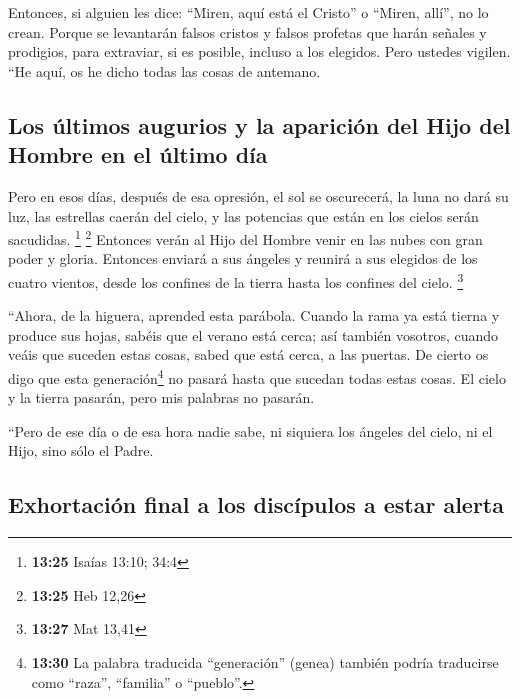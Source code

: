 \begin{paracol}{2}
 Entonces, si alguien les dice: ``Miren, aquí está el
Cristo'' o ``Miren, allí'', no lo crean.  Porque se
levantarán falsos cristos y falsos profetas que harán señales y
prodigios, para extraviar, si es posible, incluso a los elegidos.
 Pero ustedes vigilen. ``He aquí, os he dicho todas las
cosas de antemano.

\hypertarget{los-uxfaltimos-augurios-y-la-apariciuxf3n-del-hijo-del-hombre-en-el-uxfaltimo-duxeda}{%
\subsection{Los últimos augurios y la aparición del Hijo del Hombre en
el último
día}\label{los-uxfaltimos-augurios-y-la-apariciuxf3n-del-hijo-del-hombre-en-el-uxfaltimo-duxeda}}

 Pero en esos días, después de esa opresión, el sol se
oscurecerá, la luna no dará su luz,  las estrellas caerán
del cielo, y las potencias que están en los cielos serán sacudidas.
\footnote{\textbf{13:25} Isaías 13:10; 34:4} \footnote{\textbf{13:25}
  Heb 12,26}  Entonces verán al Hijo del Hombre venir en
las nubes con gran poder y gloria.  Entonces enviará a
sus ángeles y reunirá a sus elegidos de los cuatro vientos, desde los
confines de la tierra hasta los confines del cielo. \footnote{\textbf{13:27}
  Mat 13,41}

 ``Ahora, de la higuera, aprended esta parábola. Cuando
la rama ya está tierna y produce sus hojas, sabéis que el verano está
cerca;  así también vosotros, cuando veáis que suceden
estas cosas, sabed que está cerca, a las puertas.  De
cierto os digo que esta generación\footnote{\textbf{13:30} La palabra
  traducida ``generación'' (genea) también podría traducirse como
  ``raza'', ``familia'' o ``pueblo''.} no pasará hasta que sucedan todas
estas cosas.  El cielo y la tierra pasarán, pero mis
palabras no pasarán.

 ``Pero de ese día o de esa hora nadie sabe, ni siquiera
los ángeles del cielo, ni el Hijo, sino sólo el Padre.

\hypertarget{exhortaciuxf3n-final-a-los-discuxedpulos-a-estar-alerta}{%
\subsection{Exhortación final a los discípulos a estar
alerta}\label{exhortaciuxf3n-final-a-los-discuxedpulos-a-estar-alerta}}


\end{paracol}
